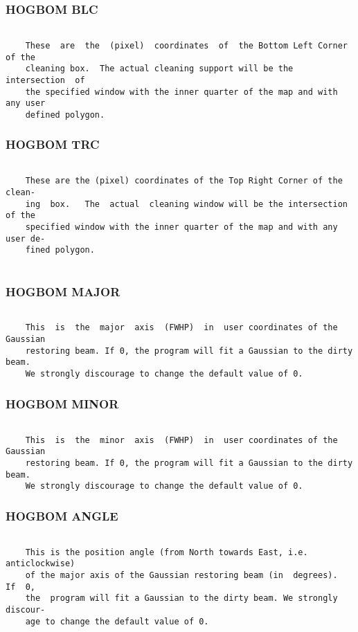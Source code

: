 \subsubsection{HOGBOM BLC}
\begin{verbatim}

    These  are  the  (pixel)  coordinates  of  the Bottom Left Corner of the
    cleaning box.  The actual cleaning support will be the  intersection  of
    the specified window with the inner quarter of the map and with any user
    defined polygon.

\end{verbatim}
\subsubsection{HOGBOM TRC}
\begin{verbatim}

    These are the (pixel) coordinates of the Top Right Corner of the  clean-
    ing  box.   The  actual  cleaning window will be the intersection of the
    specified window with the inner quarter of the map and with any user de-
    fined polygon.


\end{verbatim}
\subsubsection{HOGBOM MAJOR}
\begin{verbatim}

    This  is  the  major  axis  (FWHP)  in  user coordinates of the Gaussian
    restoring beam. If 0, the program will fit a Gaussian to the dirty beam.
    We strongly discourage to change the default value of 0.

\end{verbatim}
\subsubsection{HOGBOM MINOR}
\begin{verbatim}

    This  is  the  minor  axis  (FWHP)  in  user coordinates of the Gaussian
    restoring beam. If 0, the program will fit a Gaussian to the dirty beam.
    We strongly discourage to change the default value of 0.

\end{verbatim}
\subsubsection{HOGBOM ANGLE}
\begin{verbatim}

    This is the position angle (from North towards East, i.e. anticlockwise)
    of the major axis of the Gaussian restoring beam (in  degrees).   If  0,
    the  program will fit a Gaussian to the dirty beam. We strongly discour-
    age to change the default value of 0.

\end{verbatim}

